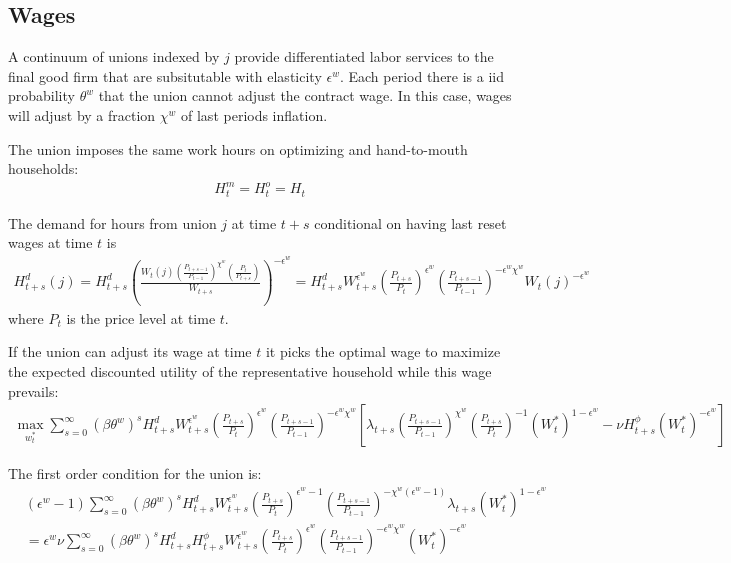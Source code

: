 \documentclass[11pt]{article}
\begin{document}
\subsection{Wages}

A continuum of unions indexed by $j$ provide differentiated labor services to the final good firm that are subsitutable with elasticity $\epsilon^w$. Each period there is a iid probability $\theta^w$ that the union cannot adjust the contract wage. In this case, wages will adjust by a fraction $\chi^w$ of last periods inflation.

The union imposes the same work hours on optimizing and hand-to-mouth households:
\begin{align*}
	H_t^m = H_t^o = H_t
\end{align*}

The demand for hours from union $j$ at time $t+s$ conditional on having last reset wages at time $t$ is
\begin{align*}
	H_{t+s}^d(j) = H_{t+s}^d \left(\frac{W_{t}(j)(\frac{P_{t+s-1}}{P_{t-1}})^{\chi^w} (\frac{P_t}{P_{t+s}})}{W_{t+s}}\right)^{-\epsilon^w} = H_{t+s}^d W_{t+s}^{\epsilon^w} \left(\frac{P_{t+s}}{P_{t}}\right)^{\epsilon^w} \left(\frac{P_{t+s-1}}{P_{t-1}}\right)^{-\epsilon^w\chi^w}  W_{t}(j)^{-\epsilon^w}
\end{align*}
where $P_t$ is the price level at time $t$.

If the union can adjust its wage at time $t$ it picks the optimal wage to maximize the expected discounted utility of the representative household while this wage prevails:
\begin{align*}
	\max_{w_t^*} \sum_{s=0}^{\infty} (\beta\theta^w)^{s}H_{t+s}^d W_{t+s}^{\epsilon^w} \left(\frac{P_{t+s}}{P_{t}}\right)^{\epsilon^w}\left(\frac{P_{t+s-1}}{P_{t-1}}\right)^{-\epsilon^w\chi^w}\left[\lambda_{t+s}\left(\frac{P_{t+s-1}}{P_{t-1}}\right)^{\chi^w}\left(\frac{P_{t+s}}{P_{t}}\right)^{-1}(W_t^*)^{1-\epsilon^w}   - \nu H_{t+s}^{\phi} (W_t^*)^{-\epsilon^w}\right]
\end{align*}


The first order condition for the union is:
\begin{align*}
	&(\epsilon^w-1)\sum_{s=0}^{\infty} (\beta\theta^w)^{s}H_{t+s}^d W_{t+s}^{\epsilon^w} \left(\frac{P_{t+s}}{P_{t}}\right)^{\epsilon^w-1} \left(\frac{P_{t+s-1}}{P_{t-1}}\right)^{-\chi^w(\epsilon^w-1)} \lambda_{t+s}(W_t^*)^{1-\epsilon^w}  \\
	& = \epsilon^w \nu \sum_{s=0}^{\infty} (\beta\theta^w)^{s}H_{t+s}^d H_{t+s}^{\phi} W_{t+s}^{\epsilon^w} \left(\frac{P_{t+s}}{P_{t}}\right)^{\epsilon^w} \left(\frac{P_{t+s-1}}{P_{t-1}}\right)^{-\epsilon^w\chi^w}  (W_t^*)^{-\epsilon^w}
\end{align*}
\end{document}
